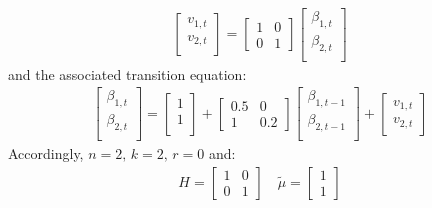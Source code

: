 \documentclass[10pt]{article}
\begin{document}
\begin{itemize}
\begin{gather}
        \begin{bmatrix}
            v_{1, t}\\
            v_{2, t}\\
        \end{bmatrix}
        = 
        \begin{bmatrix}
            1 & 0 \\
            0 & 1
        \end{bmatrix}
        \begin{bmatrix}
            \beta_{1, t}\\
            \beta_{2, t}\\
        \end{bmatrix}
    \end{gather}
    and the associated transition equation: 
    \begin{gather*}
        \begin{bmatrix}
            \beta_{1, t}\\
            \beta_{2, t}\\
        \end{bmatrix}
        = 
        \begin{bmatrix}
            1\\
            1\\
        \end{bmatrix}
        + 
        \begin{bmatrix}
            0.5 & 0\\
            1 & 0.2
        \end{bmatrix}
        \begin{bmatrix}
            \beta_{1, t - 1}\\
            \beta_{2, t -1 }\\
        \end{bmatrix}
        + \begin{bmatrix}
            v_{1, t}\\
            v_{2, t}
        \end{bmatrix}
    \end{gather*}
    Accordingly, $n = 2,\, k = 2,\, r = 0 $ and: 
    \begin{gather*}
        H = \begin{bmatrix}
            1 & 0 \\
            0 & 1
        \end{bmatrix}
        \quad \tilde{\mu} = \begin{bmatrix}
            1 \\ 1

\end{bmatrix}
\end{gather*}
\end{itemize}
\end{document}
